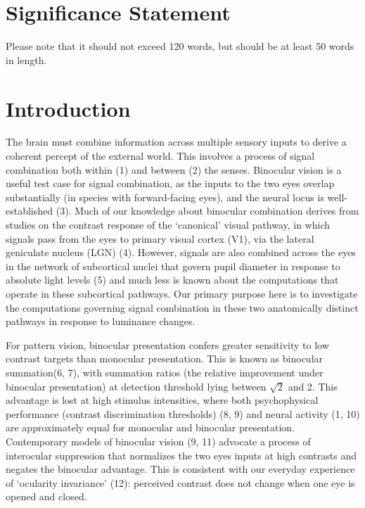 \documentclass[
]{article}
\begin{document}
\hypertarget{significance-statement}{%
\section{Significance Statement}\label{significance-statement}}

Please note that it should not exceed 120 words, but should be at least 50 words in length.

\hypertarget{introduction}{%
\section{Introduction}\label{introduction}}

The brain must combine information across multiple sensory inputs to derive a coherent percept of the external world. This involves a process of signal combination both within (1) and between (2) the senses. Binocular vision is a useful test case for signal combination, as the inputs to the two eyes overlap substantially (in species with forward-facing eyes), and the neural locus is well-established (3). Much of our knowledge about binocular combination derives from studies on the contrast response of the `canonical' visual pathway, in which signals pass from the eyes to primary visual cortex (V1), via the lateral geniculate nucleus (LGN) (4). However, signals are also combined across the eyes in the network of subcortical nuclei that govern pupil diameter in response to absolute light levels (5) and much less is known about the computations that operate in these subcortical pathways. Our primary purpose here is to investigate the computations governing signal combination in these two anatomically distinct pathways in response to luminance changes.

For pattern vision, binocular presentation confers greater sensitivity to low contrast targets than monocular presentation. This is known as binocular summation(6, 7), with summation ratios (the relative improvement under binocular presentation) at detection threshold lying between \(\sqrt{2}\) and 2. This advantage is lost at high stimulus intensities, where both psychophysical performance (contrast discrimination thresholds) (8, 9) and neural activity (1, 10) are approximately equal for monocular and binocular presentation. Contemporary models of binocular vision (9, 11) advocate a process of interocular suppression that normalizes the two eyes inputs at high contrasts and negates the binocular advantage. This is consistent with our everyday experience of `ocularity invariance' (12): perceived contrast does not change when one eye is opened and closed.
\end{document}
